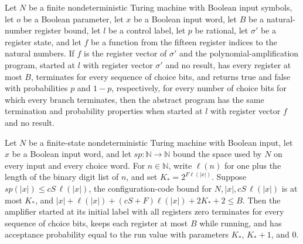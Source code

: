 \begin{lemma}
\label{Randomized.PolyAmp.PS.of_v}
\leanok
{}
Let $N$ be a finite nondeterministic Turing machine with Boolean input symbols, let $o$
be a Boolean parameter, let $x$ be a Boolean input word, let $B$ be a natural-number
register bound, let $l$ be a control label, let $p$ be rational, let $\sigma'$ be a
register state, and let $f$ be a function from the fifteen register indices to the
natural numbers. If $f$ is the register vector of $\sigma'$ and the
polynomial-amplification program, started at $l$ with register vector $\sigma'$ and no
result, has every register at most $B$, terminates for every sequence of choice bits,
and returns true and false with probabilities $p$ and $1-p$, respectively, for every
number of choice bits for which every branch terminates, then the abstract program has
the same termination and probability properties when started at $l$ with register vector
$f$ and no result.
\end{lemma}

\begin{theorem}
\label{Randomized.PolyAmp.ps_start}
\leanok
{}
Let $N$ be a finite-state nondeterministic Turing machine with Boolean input, let $x$ be
a Boolean input word, and let $sp:\mathbb{N}\to\mathbb{N}$ bound the space used by $N$
on every input and every choice word. For $n\in\mathbb{N}$, write $\ell(n)$ for one plus
the length of the binary digit list of $n$, and set $K_*=2^{F\ell(|x|)}$. Suppose
$sp(|x|)\le cS\,\ell(|x|)$, the configuration-code bound for $N,|x|,cS\,\ell(|x|)$ is at
most $K_*$, and $|x|+\ell(|x|)+(cS+F)\ell(|x|)+2K_*+2\le B$. Then the amplifier started
at its initial label with all registers zero terminates for every sequence of choice
bits, keeps each register at most $B$ while running, and has acceptance probability
equal to the run value with parameters $K_*$, $K_*+1$, and $0$.
\end{theorem}

